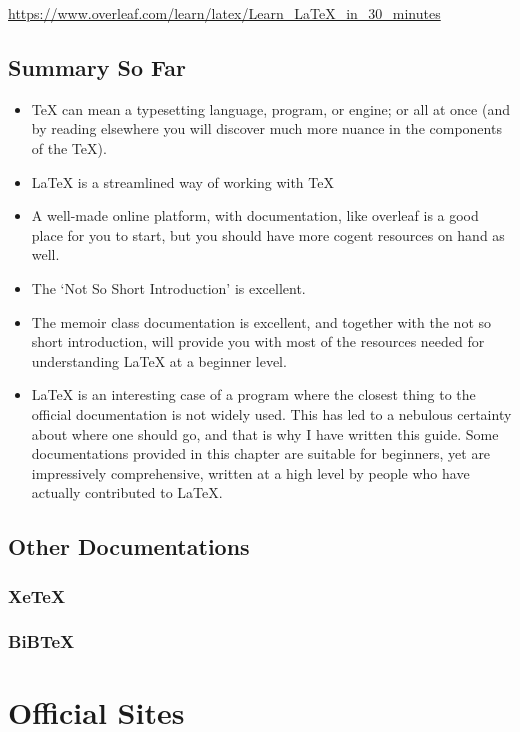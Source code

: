 \documentclass[11pt, oneside]{memoir}
\begin{document}
\url{https://www.overleaf.com/learn/latex/Learn_LaTeX_in_30_minutes}

\section{Summary So Far}
\begin{itemize}
\item \TeX{} can mean a typesetting language, program, or engine; or all at once (and by reading elsewhere you will discover much more nuance in the components of the \TeX{}).
\item \LaTeX{} is a streamlined way of working with \TeX{} 
\item A well-made online platform, with documentation, like overleaf is a good place for you to start, but you should have more cogent resources on hand as well.
\item The `Not So Short Introduction' is excellent.
\item The memoir class documentation is excellent, and together with the not so short introduction, will provide you with most of the resources needed for understanding \LaTeX{} at a beginner level.
\item \LaTeX{} is an interesting case of a program where the closest thing to the official documentation is not widely used. This has led to a nebulous certainty about where one should go, and that is why I have written this guide. Some documentations provided in this chapter are suitable for beginners, yet are impressively comprehensive, written at a high level by people who have actually contributed to LaTeX.
\end{itemize}

\section{Other Documentations}
\subsection{XeTeX}

\subsection{BiBTeX}

\chapter{Official Sites}
\end{document}
